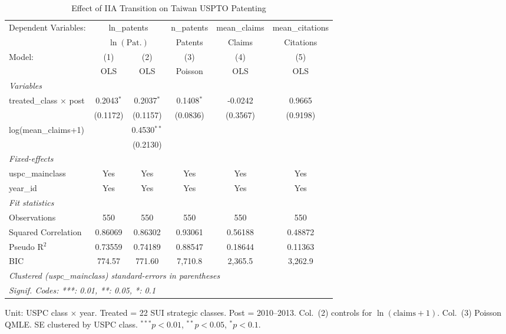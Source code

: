 
\begin{table}[htbp]
   \caption{\label{tab:main_did} Effect of IIA Transition on Taiwan USPTO Patenting}
   \centering
   \begin{adjustbox}{max width=\textwidth}\begin{tabular}{lccccc}
      \tabularnewline \midrule \midrule
      Dependent Variables: & \multicolumn{2}{c}{ln\_patents} & n\_patents & mean\_claims & mean\_citations\\
       & \multicolumn{2}{c}{$\ln(\text{Pat.})$} & Patents & Claims & Citations \\ 
      Model:                         & (1)          & (2)           & (3)          & (4)      & (5)\\  
                                     &  OLS         & OLS           & Poisson      & OLS      & OLS\\  
      \midrule
      \emph{Variables}\\
      treated\_class $\times$ post   & 0.2043$^{*}$ & 0.2037$^{*}$  & 0.1408$^{*}$ & -0.0242  & 0.9665\\   
                                     & (0.1172)     & (0.1157)      & (0.0836)     & (0.3567) & (0.9198)\\   
      log(mean\_claims+1)            &              & 0.4530$^{**}$ &              &          &   \\   
                                     &              & (0.2130)      &              &          &   \\   
      \midrule
      \emph{Fixed-effects}\\
      uspc\_mainclass                & Yes          & Yes           & Yes          & Yes      & Yes\\  
      year\_id                       & Yes          & Yes           & Yes          & Yes      & Yes\\  
      \midrule
      \emph{Fit statistics}\\
      Observations                   & 550          & 550           & 550          & 550      & 550\\  
      Squared Correlation            & 0.86069      & 0.86302       & 0.93061      & 0.56188  & 0.48872\\  
      Pseudo R$^2$                   & 0.73559      & 0.74189       & 0.88547      & 0.18644  & 0.11363\\  
      BIC                            & 774.57       & 771.60        & 7,710.8      & 2,365.5  & 3,262.9\\  
      \midrule \midrule
      \multicolumn{6}{l}{\emph{Clustered (uspc\_mainclass) standard-errors in parentheses}}\\
      \multicolumn{6}{l}{\emph{Signif. Codes: ***: 0.01, **: 0.05, *: 0.1}}\\
   \end{tabular}\end{adjustbox}
   
   \par \raggedright 
   Unit: USPC class $\times$ year. Treated = 22 SUI strategic classes. Post = 2010--2013. Col.\ (2) controls for $\ln(\text{claims}+1)$. Col.\ (3) Poisson QMLE. SE clustered by USPC class. $^{***}p<0.01$, $^{**}p<0.05$, $^{*}p<0.1$.
\end{table}


